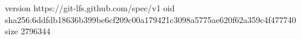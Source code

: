 version https://git-lfs.github.com/spec/v1
oid sha256:6ddfdb18636b399be6cf209c00a179421c3098a5775ae620f62a359c4f477740
size 2796344
